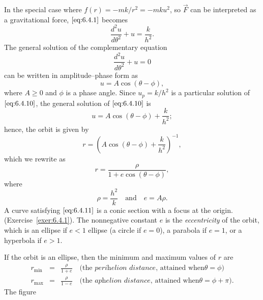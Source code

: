 \documentclass{ximera}
\begin{document}
In the special case where
 $f(r)=-mk/r^2=-mku^2$, so $\vec{F}$  can be interpreted
as a gravitational force, $\eqref{eq:6.4.1}$ becomes
\begin{equation} \label{eq:6.4.10}
 \frac{d^2u}{d\theta^2}+u=\frac{k}{h^2}.
\end{equation}
The general solution of the complementary equation
$$
 \frac{d^2u}{d\theta^2}+u=0
$$
can be written in amplitude--phase form as
$$
u=A\cos(\theta-\phi),
$$
where $A\ge0$ and $\phi$ is a phase angle.
Since $u_p=k/h^2$ is a particular solution of $\eqref{eq:6.4.10}$,
the general solution of $\eqref{eq:6.4.10}$ is
$$
u=A\cos(\theta-\phi)+\frac{k}{h^2};
$$
hence, the orbit is given by
$$
r=\left(A\cos(\theta-\phi)+\frac{k}{h^2}\right)^{-1},
$$
which we rewrite as
\begin{equation} \label{eq:6.4.11}
r=\frac{\rho}{1+e\cos(\theta-\phi)},
\end{equation}
where
$$
\rho=\frac{h^2}{k}\quad\mbox{and}\quad e=A\rho.
$$
A curve satisfying $\eqref{eq:6.4.11}$ is a conic section with a focus at
the origin.(Exercise~\ref{exer:6.4.1}). 
The nonnegative constant $e$ is
 the \textit{eccentricity} of the orbit, which is
an ellipse if
$e<1$
ellipse (a circle if $e=0$), a parabola if $e=1$, or a hyperbola if $e>1$.




If  the orbit is an ellipse, then the minimum and maximum
values of $r$  are
\begin{eqnarray*}
r_{\min}&=&\frac{\rho}{1+e}\quad\text{(the }\textit{perihelion
distance}\text{, attained when
$\theta=\phi$)}  \\
 r_{\max}&=&\frac{\rho}{1-e}\quad\text{(the }
\textit{aphelion distance}\text{, attained when
$\theta=\phi+\pi$)}.
\end{eqnarray*}
The figure

\begin{center}
\end{center}
\end{document}
